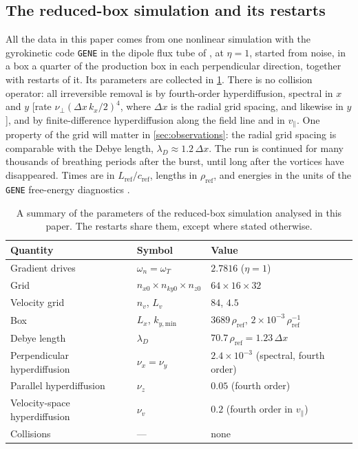 \documentclass{jpp}
\newcommand{\lambdaD}{\lambda_D}
\newcommand{\gene}{\texttt{GENE}}
\newcommand{\dx}{\Delta x}
\begin{document}
\subsection{The reduced-box simulation and its restarts}\label{sec:runs}

All the data in this paper comes from one nonlinear simulation with the gyrokinetic code \gene{} \citep{Jenko2000} in the dipole flux tube of \citet{KennedyPlunkLetter}, at \(\eta = 1\), started from noise, in a box a quarter of the production box in each perpendicular direction, together with restarts of it. Its parameters are collected in \cref{tab:runs}. There is no collision operator: all irreversible removal is by fourth-order hyperdiffusion, spectral in \(x\) and \(y\) [rate \(\nu_\perp(\dx\,k_x/2)^4\), where \(\dx\) is the radial grid spacing, and likewise in \(y\)], and by finite-difference hyperdiffusion along the field line and in \(v_\parallel\). One property of the grid will matter in \cref{sec:observations}: the radial grid spacing is comparable with the Debye length, \(\lambdaD\approx1.2\,\dx\). The run is continued for many thousands of breathing periods after the burst, until long after the vortices have disappeared. Times are in \(L_\text{ref}/c_\text{ref}\), lengths in \(\rho_\text{ref}\), and energies in the units of the \gene{} free-energy diagnostics \citep{BanonNavarro2011, BanonNavarro2016}.

\begin{table}
\centering
\begin{tabular}{lll}
\toprule
Quantity & Symbol & Value \\
\midrule
Gradient drives & \(\omega_n = \omega_T\) & \(2.7816\) (\(\eta = 1\)) \\
Grid & \(n_{x0}\times n_{ky0}\times n_{z0}\) & \(64\times16\times32\) \\
Velocity grid & \(n_v\), \(L_v\) & \(84\), \(4.5\) \\
Box & \(L_x\), \(k_{y,\text{min}}\) & \(3689\,\rho_\text{ref}\), \(2\times10^{-3}\,\rho_\text{ref}^{-1}\) \\
Debye length & \(\lambdaD\) & \(70.7\,\rho_\text{ref} = 1.23\,\dx\) \\
Perpendicular hyperdiffusion & \(\nu_x = \nu_y\) & \(2.4\times10^{-3}\) (spectral, fourth order) \\
Parallel hyperdiffusion & \(\nu_z\) & \(0.05\) (fourth order) \\
Velocity-space hyperdiffusion & \(\nu_v\) & \(0.2\) (fourth order in \(v_\parallel\)) \\
Collisions & --- & none \\
\bottomrule
\end{tabular}
\caption{A summary of the parameters of the reduced-box simulation analysed in this paper. The restarts share them, except where stated otherwise.}
\label{tab:runs}
\end{table}
\end{document}
